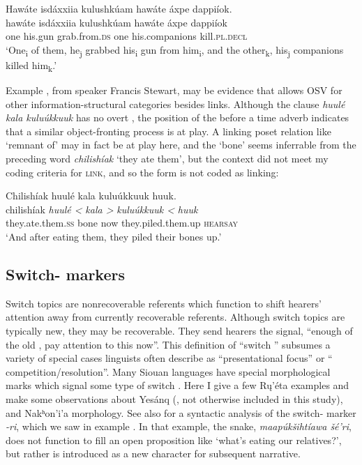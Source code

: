 \documentclass[output=paper]{LSP/langsci}
\begin{document}
\ea\label{apsaalookeosv}
	Hawáte isdáxxiia kulushkúam hawáte áxpe dappiíok.\\
\gll	hawáte 	isdáxxiia 	kulushkúam			hawáte 	áxpe 			dappiíok\\
	one 		his.gun 	grab.from.\textsc{ds} 	one 		his.companions	kill.\textsc{pl.decl}\\
\glt	`One\textsubscript{i} of them, he\textsubscript{j} grabbed his\textsubscript{i} gun from him\textsubscript{i}, and the other\textsubscript{k}, his\textsubscript{j} companions killed him\textsubscript{k}.'
\z

Example , from speaker Francis Stewart, may be evidence that  allows OSV for other information-structural categories besides links. Although the clause \emph{huulé kala kuluúkkuuk} has no overt , the position of the  before a time adverb indicates that a similar object-fronting process is at play. A linking poset relation like `remnant of' may in fact be at play here, and the  `bone' seems inferrable from the preceding word \emph{chilishíak} `they ate them', but the context did not meet my coding criteria for \textsc{link}, and so the form is not coded as linking:

\ea\label{stewartosv}
Chilishíak huulé kala kuluúkkuuk huuk.\footnotemark\\
\gll	chilishíak 				\emph{huulé <}	\emph{kala >}	\emph{kuluúkkuuk <}	\emph{huuk}\\
	they.ate.them.\textsc{ss} 	bone 			now 			they.piled.them.up 		\textsc{hearsay}\\
\glt	`And after eating them, they piled their bones up.'
\z

\subsection{Switch- markers}\label{switchtopic}

	Switch topics are nonrecoverable referents which function to shift hearers’ attention away from currently recoverable referents. Although switch topics are typically new, they may be recoverable. They send hearers the signal, “enough of the old , pay attention to this now”. This definition of “switch ” subsumes a variety of special cases linguists often describe as “presentational focus” or “ competition/resolution”. Many Siouan languages have special morphological marks which signal some type of switch . Here I give a few Rų’éta examples and make some observations about Yesánq (, not otherwise included in this study),  and Nakʰon’i’a morphology. See also \citet[288--293]{Boyle2007} for a syntactic analysis of the  switch- marker \emph{-ri}, which we saw in example . In that example, the snake, \emph{maapúkšihtíawa šé’ri}, does not function to fill an open proposition like `what’s eating our relatives?', but rather is introduced as a new character for subsequent narrative.
	
\end{document}
